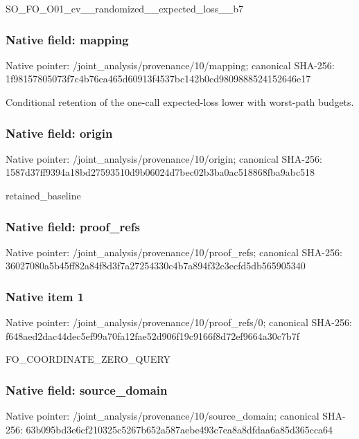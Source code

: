 \documentclass[10pt,a4paper]{article}
\begin{document}
\begingroup\raggedright\sloppy SO\_\allowbreak{}FO\_\allowbreak{}O01\_\allowbreak{}cv\_\allowbreak{}\_\allowbreak{}randomized\_\allowbreak{}\_\allowbreak{}expected\_\allowbreak{}loss\_\allowbreak{}\_\allowbreak{}b7\par\endgroup

\subsubsection{Native field: mapping}
Native pointer: /joint\_\allowbreak{}analysis/provenance/10/mapping; canonical SHA-256: 1f98157805073f7c4b76ca465d60913f4537bc142b0cd9809888524152646e17

\begingroup\raggedright\sloppy Conditional retention of the one-call expected-loss lower with worst-path budgets.\par\endgroup

\subsubsection{Native field: origin}
Native pointer: /joint\_\allowbreak{}analysis/provenance/10/origin; canonical SHA-256: 1587d37ff9394a18bd27593510d9b06024d7bec02b3ba0ac518868fba9abc518

\begingroup\raggedright\sloppy retained\_\allowbreak{}baseline\par\endgroup

\subsubsection{Native field: proof\_\allowbreak{}refs}
Native pointer: /joint\_\allowbreak{}analysis/provenance/10/proof\_\allowbreak{}refs; canonical SHA-256: 36027080a5b45ff82a84f8d3f7a27254330c4b7a894f32c3ecfd5db565905340

\subsubsection{Native item 1}
Native pointer: /joint\_\allowbreak{}analysis/provenance/10/proof\_\allowbreak{}refs/0; canonical SHA-256: f648aed2dac44dec5ef99a70fa12fae52d906f19c9166f8d72ef9664a30c7b7f

\begingroup\raggedright\sloppy FO\_\allowbreak{}COORDINATE\_\allowbreak{}ZERO\_\allowbreak{}QUERY\par\endgroup

\subsubsection{Native field: source\_\allowbreak{}domain}
Native pointer: /joint\_\allowbreak{}analysis/provenance/10/source\_\allowbreak{}domain; canonical SHA-256: 63b095bd3e6cf210325c5267b652a587aebe493c7ea8a8dfdaa6a85d365cca64
\end{document}
